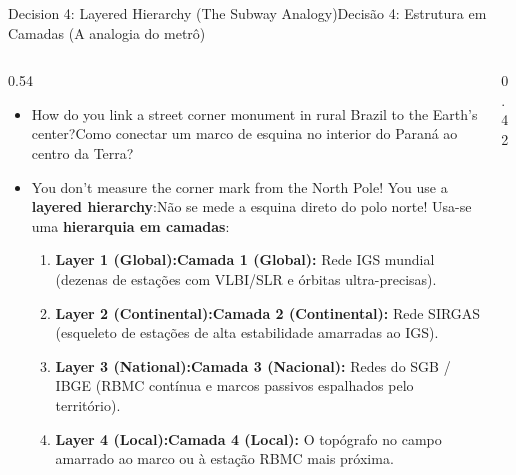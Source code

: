 \documentclass[aspectratio=169,11pt]{beamer}
\newcommand{\tr}[2]{\ifEN#2\else#1\fi}
\begin{document}
\begin{frame}{\tr{Decisão 4: Estrutura em Camadas (A analogia do metrô)}{Decision 4: Layered Hierarchy (The Subway Analogy)}}
  \begin{columns}[onlytextwidth]
    \begin{column}{0.54\textwidth}
      \begin{itemize}
        \setlength{\itemsep}{4pt}
        \scriptsize
        \item \tr{Como conectar um marco de esquina no interior do Paraná ao centro da Terra?}{How
              do you link a street corner monument in rural Brazil to the Earth's center?}
        \item \tr{Não se mede a esquina direto do polo norte! Usa-se uma \textbf{hierarquia em camadas}:}{You
              don't measure the corner mark from the North Pole! You use a \textbf{layered hierarchy}:}
              \begin{enumerate}
                \tiny
                \item \textbf{\tr{Camada 1 (Global):}{Layer 1 (Global):}} Rede IGS mundial (dezenas de
                      estações com VLBI/SLR e órbitas ultra-precisas).
                \item \textbf{\tr{Camada 2 (Continental):}{Layer 2 (Continental):}} Rede SIRGAS
                      (esqueleto de estações de alta estabilidade amarradas ao IGS).
                \item \textbf{\tr{Camada 3 (Nacional):}{Layer 3 (National):}} Redes do SGB / IBGE
                      (RBMC contínua e marcos passivos espalhados pelo território).
                \item \textbf{\tr{Camada 4 (Local):}{Layer 4 (Local):}} O topógrafo no campo amarrado
                      ao marco ou à estação RBMC mais próxima.
              \end{enumerate}
      \end{itemize}
    \end{column}
    \begin{column}{0.42\textwidth}
      \centering
\end{column}
\end{columns}
\end{frame}
\end{document}
